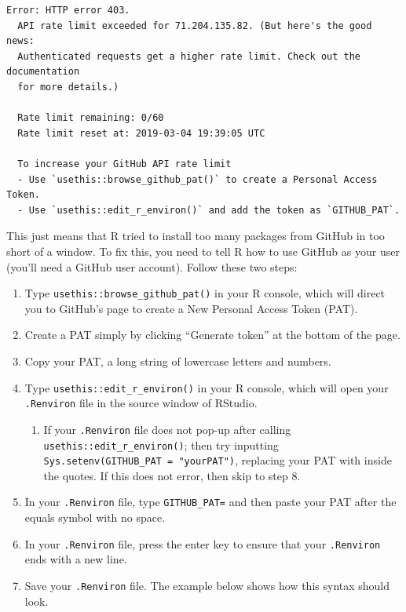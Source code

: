 \documentclass[12pt, krantz2,]{krantz}
\providecommand{\tightlist}{%
  \setlength{\itemsep}{0pt}\setlength{\parskip}{0pt}}
\theoremstyle{definition}
\theoremstyle{definition}
\theoremstyle{definition}
\newcommand{\1}{\mathbbm{1}}
\begin{document}
\begin{verbatim}
Error: HTTP error 403.
  API rate limit exceeded for 71.204.135.82. (But here's the good news:
  Authenticated requests get a higher rate limit. Check out the documentation
  for more details.)

  Rate limit remaining: 0/60
  Rate limit reset at: 2019-03-04 19:39:05 UTC

  To increase your GitHub API rate limit
  - Use `usethis::browse_github_pat()` to create a Personal Access Token.
  - Use `usethis::edit_r_environ()` and add the token as `GITHUB_PAT`.
\end{verbatim}

This just means that R tried to install too many packages from GitHub in too
short of a window. To fix this, you need to tell R how to use GitHub as your
user (you'll need a GitHub user account). Follow these two steps:

\begin{enumerate}
\def\labelenumi{\arabic{enumi}.}
\item
  Type \texttt{usethis::browse\_github\_pat()} in your R console, which will direct
  you to GitHub's page to create a New Personal Access Token (PAT).
\item
  Create a PAT simply by clicking ``Generate token'' at the bottom of the page.
\item
  Copy your PAT, a long string of lowercase letters and numbers.
\item
  Type \texttt{usethis::edit\_r\_environ()} in your R console, which will open your
  \texttt{.Renviron} file in the source window of RStudio.

  \begin{enumerate}
  \def\labelenumii{\alph{enumii}.}
  \tightlist
  \item
    If your \texttt{.Renviron} file does not pop-up after calling
    \texttt{usethis::edit\_r\_environ()}; then try inputting
    \texttt{Sys.setenv(GITHUB\_PAT\ =\ "yourPAT")}, replacing your PAT with inside the
    quotes. If this does not error, then skip to step 8.
  \end{enumerate}
\item
  In your \texttt{.Renviron} file, type \texttt{GITHUB\_PAT=} and then paste your PAT after
  the equals symbol with no space.
\item
  In your \texttt{.Renviron} file, press the enter key to ensure that your \texttt{.Renviron}
  ends with a new line.
\item
  Save your \texttt{.Renviron} file. The example below shows how this syntax should
  look.
\end{enumerate}
\end{document}
